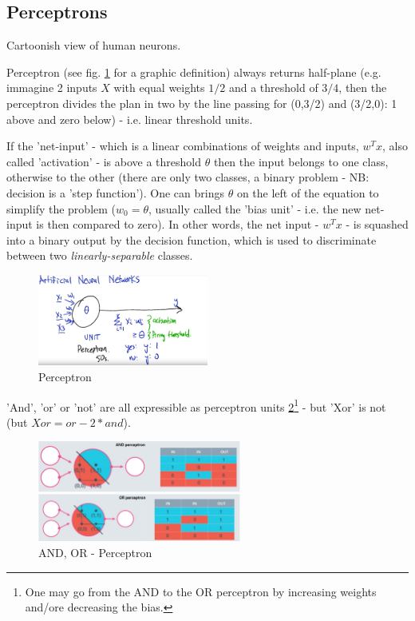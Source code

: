 \documentclass[11pt]{article}
\begin{document}
\subsection{Perceptrons} \label{perceptrons}

Cartoonish view of human neurons.

Perceptron (see fig. \ref{perceptron} for a graphic definition) always returns half-plane (e.g. immagine 2 inputs $X$ with equal weights $1/2$ and a threshold of $3/4$, then the perceptron divides the plan in two by the line passing for (0,3/2) and (3/2,0): 1 above and zero below) - i.e. linear threshold units.

If the 'net-input' - which is a linear combinations of weights and inputs,  $w^T x$, also called 'activation' - is above a threshold $\theta$ then the input belongs to one class, otherwise to the other (there are only two classes, a binary problem - NB: decision is a 'step function'). One can brings $\theta$ on the left of the equation to simplify the problem ($w_0 = \theta$, usually called the 'bias unit' - i.e. the new net-input is then compared to zero). In other words, the net input - $w^T x$ - is squashed into a binary output by the decision function, which is used to discriminate between two \textit{linearly-separable} classes.
\begin{figure}[htbp] 
	\centering
	\includegraphics[width=0.5\textwidth]{pics/perceptron}
	\caption{Perceptron} 
	\label{perceptron}
\end{figure}

'And', 'or' or 'not' are all expressible as perceptron units \ref{and_or_perceptron}\footnote{One may go from the AND to the OR perceptron by increasing weights and/ore decreasing the bias.} - but 'Xor' is not (but $Xor = or - 2 * and$). 
\begin{figure}[htbp] 
	\centering
	\includegraphics[width=0.6\textwidth]{pics/and_or_perceptron}
	\caption{AND, OR - Perceptron} 
	\label{and_or_perceptron}
\end{figure}
\end{document}
